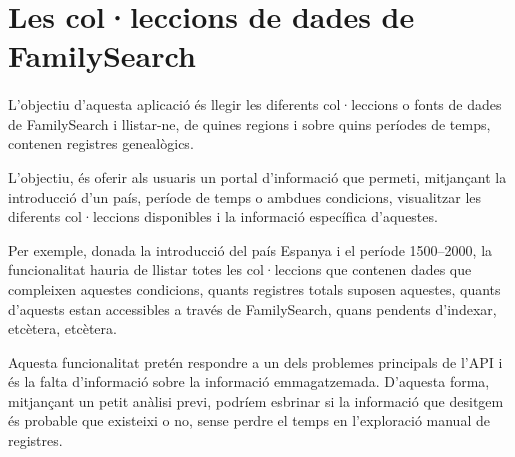 \section{Les col·leccions de dades de FamilySearch}

    \paragraph{}
    L'objectiu d'aquesta aplicació és llegir les diferents col·leccions o fonts de dades de FamilySearch i llistar-ne, de quines regions i sobre quins períodes de temps, contenen registres genealògics.

    L'objectiu, és oferir als usuaris un portal d'informació que permeti, mitjançant la introducció d'un país, període de temps o ambdues condicions, visualitzar les diferents col·leccions disponibles i la informació específica d'aquestes.

    Per exemple, donada la introducció del país Espanya i el període 1500--2000, la funcionalitat hauria de llistar totes les col·leccions que contenen dades que compleixen aquestes condicions, quants registres totals suposen aquestes, quants d'aquests estan accessibles a través de FamilySearch, quans pendents d'indexar, etcètera, etcètera.

    Aquesta funcionalitat pretén respondre a un dels problemes principals de l'API i és la falta d'informació sobre la informació emmagatzemada. D'aquesta forma, mitjançant un petit anàlisi previ, podríem esbrinar si la informació que desitgem és probable que existeixi o no, sense perdre el temps en l'exploració manual de registres.
